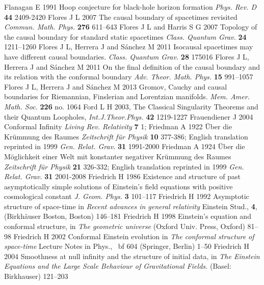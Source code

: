 \documentclass[12pt]{iopart}
\begin{document}
\begin{thebibliography}{999}
 Flanagan E 1991 Hoop conjecture for black-hole horizon formation {\it Phys. Rev. D} {\bf 44} 2409-2420
  Flores J L 2007 The causal boundary of spacetimes revisited {\it Commun. Math. Phys.} {\bf 276}  611--643
 Flores J L and Harris S G 2007 Topology of the causal boundary for standard static spacetimes {\it Class. Quantum Grav.} {\bf 24}  1211--1260
 Flores J L,  Herrera J and  S\'anchez M 2011 Isocausal spacetimes may have different causal boundaries.  {\it Class. Quantum Grav.} {\bf 28} 175016
  Flores J L,  Herrera J and  S\'anchez M 2011 On the final definition of the causal boundary and its relation with the conformal boundary {\it Adv. Theor. Math. Phys.} {\bf  15} 991--1057
 Flores J L,  Herrera J and  S\'anchez M 2013 Gromov, Cauchy and causal boundaries for Riemannian, Finslerian and Lorentzian manifolds. {\it Mem. Amer. Math. Soc.} {\bf 226} no. 1064
 Ford L H 2003, The Classical Singularity Theorems and their Quantum Loopholes, {\it Int.J.Theor.Phys.} {\bf 42}  1219-1227%
 Frauendiener J 2004 Conformal Infinity  {\it Living Rev. Relativity} {\bf 7}   1;  
 Friedman A 1922 \"{U}ber 
die Kr\"ummung des Raumes {\it Zeitschrift f\"ur Physik} {\bf 10} 
377-386; English translation reprinted in 1999 {\it Gen. Relat. Grav.} {\bf 31} 1991-2000 
 Friedman A 1924 \"{U}ber die M\"oglichkeit einer Welt mit konstanter negativer Kr\"ummung des 
Raumes {\it Zeitschrift f\"ur Physik} {\bf 21} 326-332;
English translation reprinted in 1999 {\it Gen. Relat. Grav.} {\bf 31} 2001-2008
 Friedrich H 1986 Existence and structure of past asymptotically simple solutions of Einstein's field equations with positive cosmological constant {\it J. Geom. Phys.} {\bf  3} 101--117 
 Friedrich H 1992 Asymptotic structure of space-time in {\it Recent advances in general relativity} Einstein Stud., {\bf 4}, (Birkh\"auser Boston, Boston) 146--181
 Friedrich H 1998 Einstein's equation and conformal structure, in {\it The geometric universe}  (Oxford Univ. Press, Oxford)  81--98
 Friedrich H 2002 Conformal Einstein evolution in {\it The conformal structure of space-time} Lecture Notes in Phys., {\ bf 604} (Springer, Berlin) 1--50
 Friedrich H 2004 Smoothness at null infinity and the structure of initial data, in {\it The Einstein Equations and the Large Scale Behaviour of Gravitational Fields.} (Basel: Birkhauser) 121--203

\end{thebibliography}
\end{document}
